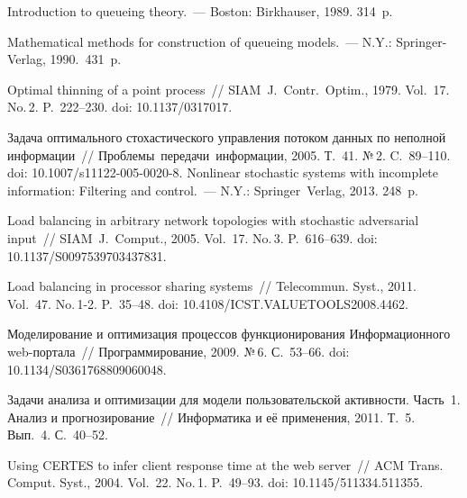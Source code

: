 \begin{multicols}{2}
{}

{\small\frenchspacing
 {%
 \begin{thebibliography}{99}
Introduction to queueing theory.~--- Boston: Birkhauser, 1989. 314~p.

 Mathematical methods for construction of queueing models.~--- N.Y.: Springer-Verlag, 1990.~431~p.

 Optimal thinning of a point process~//
SIAM~J.~Contr.~Optim., 1979. Vol.~17. No.\,2. P.~222--230.
doi: 10.1137/0317017.

Задача оптимального стохастического управ\-ле\-ния потоком данных по
неполной информации~//
Проблемы~передачи~информации, 2005. Т.~41. №\,2. C.~89--110.
doi: 10.1007/s11122-005-0020-8.
 Nonlinear stochastic systems with incomplete
information: Filtering and control.~--- N.Y.: Springer~Verlag, 2013. 248~p.

Load balancing in arbitrary network topologies
with stochastic adversarial input~// SIAM~J.~Comput., 2005. Vol.~17. No.\,3. P.~616--639.
doi: 10.1137/S0097539703437831.

 Load balancing in processor sharing systems~//
Telecommun. Syst., 2011. Vol.~47. No.\,1-2. P.~35--48.
doi: 10.4108/ICST.VALUETOOLS2008.4462.

 Моделирование и оптимизация процессов функционирования
Информационного web-портала~// Программирование, 2009. №\,6. С.~53--66.
doi: 10.1134/S0361768809060048.

 Задачи анализа и оптимизации для модели пользовательской
активности. Часть~1. Анализ и прогнозирование~// Информатика и её применения, 2011.
Т.~5. Вып.~4. С.~40--52.

 Using CERTES to infer client
response time at the web server~// ACM Trans. Comput. Syst., 2004.
Vol.~22. No.\,1. P.~49--93.
doi: 10.1145/511334.511355.



\end{thebibliography}}}
\end{multicols}
